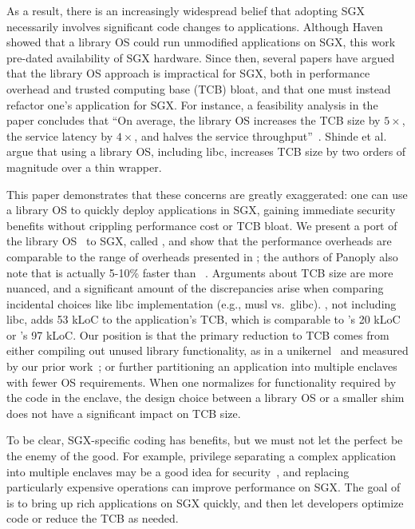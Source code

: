 As a result, there is an increasingly widespread belief that 
adopting SGX necessarily involves significant code changes to applications.
Although Haven~\cite{baumann14haven} showed that a library OS
could run unmodified applications on SGX, this work pre-dated availability of SGX hardware.
Since then, several papers have argued that the library OS approach is impractical for SGX,
both in performance overhead and trusted computing base (TCB) bloat, and that one must instead refactor one's application for SGX.
For instance, a feasibility analysis in the \scone{} paper
concludes that ``On average, the library OS increases the TCB size by $5\times$, the service latency by $4\times$,
and halves the service throughput''~\cite{osdi16scone}.
Shinde et al.~\cite{shinde17panoply} argue that using a library OS, including libc, increases TCB size by two orders of magnitude over
a thin wrapper. %


This paper demonstrates that these concerns are greatly exaggerated:
one can use a library OS
to quickly deploy applications in SGX, gaining immediate security benefits without crippling performance cost or TCB bloat.
We present a port of the \graphene{} library OS~\cite{tsai14graphene} to SGX, called \graphenesgx{},
and show that the performance overheads are comparable to the range of overheads
presented in \scone{};  the authors of Panoply also note that \graphenesgx{}
is actually 5-10\% faster than \panoply{}~\cite{shinde17panoply}.
Arguments about TCB size are more nuanced, and a significant amount of the discrepancies
arise when comparing incidental choices like libc implementation (e.g., musl vs.\ glibc).
\graphene{}, not including libc, adds 53 kLoC to the application's TCB, which is comparable to
\panoply{}'s 20 kLoC or \scone{}'s 97 kLoC. %
Our position is that the primary reduction to TCB comes from either compiling out
unused library functionality, as in a unikernel~\cite{unikernels} and measured by our prior work~\cite{tsai16apistudy};
or further partitioning an application into multiple enclaves with fewer
OS requirements.
When one normalizes for functionality required by the code in the enclave, the design choice between a library OS or a smaller shim does not have
a significant impact on TCB size.

To be clear, SGX-specific coding has benefits, but we must not let the perfect be the enemy of the good.
For example, privilege separating a complex application into multiple enclaves may be a good idea
for security~\cite{flicker,Provos:2003:PPE:1251353.1251369,shinde17panoply}, and replacing particularly expensive operations can improve performance on SGX.
The goal of \graphene{} is to bring up rich applications on SGX quickly, and then let developers
optimize code or reduce the TCB as needed.

